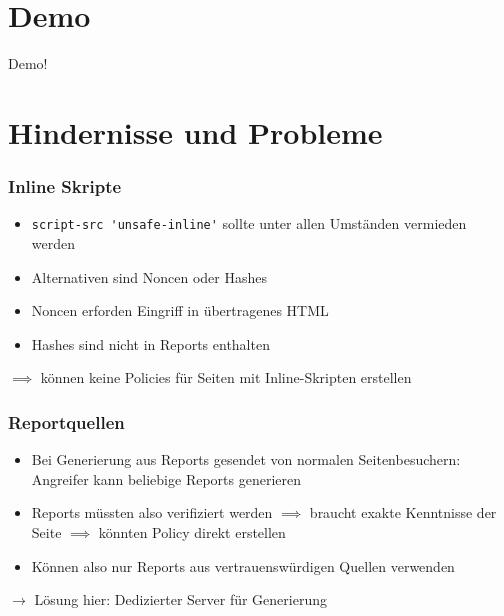 \documentclass[handout]{beamer}
\begin{document}
\section{Demo}
\begin{frame}
Demo!
\end{frame}


\section{Hindernisse und Probleme}


\begin{frame}[c]
\frametitle{Inline Skripte}
\begin{itemize}
\item \colorbox{verylightgray}{\lstinline[basicstyle=\ttfamily\color{black}]|script-src 'unsafe-inline'|} sollte unter allen Umst\"anden vermieden werden
\item Alternativen sind Noncen oder Hashes
\item Noncen erforden Eingriff in \"ubertragenes HTML
\item Hashes sind nicht in Reports enthalten
\end{itemize}
$\implies$ k\"onnen keine Policies f\"ur Seiten mit Inline-Skripten erstellen\newline
\end{frame}

%

\begin{frame}
\frametitle{Reportquellen}
\begin{itemize}
\item Bei Generierung aus Reports gesendet von normalen Seitenbesuchern: Angreifer kann beliebige Reports generieren
\item Reports m\"ussten also verifiziert werden \newline$\implies$ braucht exakte Kenntnisse der Seite \newline$\implies$ k\"onnten Policy direkt erstellen
\item K\"onnen also nur Reports aus vertrauensw\"urdigen Quellen verwenden
\end{itemize}
$\rightarrow$ L\"osung hier: Dedizierter Server f\"ur Generierung
\end{frame}
\end{document}
